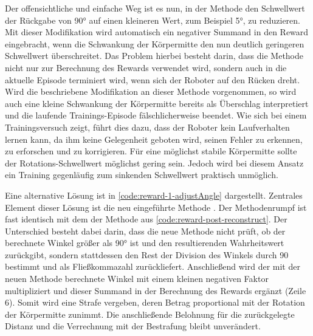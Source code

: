 Der offensichtliche und einfache Weg ist es nun, in der Methode  den Schwellwert der Rückgabe von 90° auf einen kleineren Wert, zum Beispiel 5°, zu reduzieren.
Mit dieser Modifikation wird automatisch ein negativer Summand in den Reward eingebracht, wenn die Schwankung der Körpermitte den nun deutlich geringeren Schwellwert überschreitet.
Das Problem hierbei besteht darin, dass die Methode  nicht nur zur Berechnung des Rewards verwendet wird, sondern auch in  die aktuelle Episode terminiert wird, wenn sich der Roboter auf den Rücken dreht.
Wird die beschriebene Modifikation an dieser Methode vorgenommen, so wird auch eine kleine Schwankung der Körpermitte bereits als Überschlag interpretiert und die laufende Trainings-Episode fälschlicherweise beendet.
Wie sich bei einem Trainingsversuch zeigt, führt dies dazu, dass der Roboter kein Laufverhalten lernen kann, da ihm keine Gelegenheit geboten wird, seinen Fehler zu erkennen, zu erforschen und zu korrigieren.
Für eine möglichst stabile Körpermitte sollte der Rotations-Schwellwert möglichst gering sein.
Jedoch wird bei diesem Ansatz ein Training gegenläufig zum sinkenden Schwellwert praktisch unmöglich.

\begin{figure}
    
\end{figure}

Eine alternative Lösung ist in \autoref{code:reward-1-adjustAngle} dargestellt.
Zentrales Element dieser Lösung ist die neu eingeführte Methode .
Der Methodenrumpf ist fast identisch mit dem der Methode  aus \autoref{code:reward-post-reconstruct}.
Der Unterschied besteht dabei darin, dass die neue Methode nicht prüft, ob der berechnete Winkel größer als 90° ist und den resultierenden Wahrheitswert zurückgibt, sondern stattdessen den Rest der Division des Winkels durch 90 bestimmt und als Fließkommazahl zurückliefert.
Anschließend wird der mit der neuen Methode berechnete Winkel mit einem kleinen negativen Faktor multipliziert und dieser Summand in der Berechnung des Rewards ergänzt (Zeile 6).
Somit wird eine Strafe vergeben, deren Betrag proportional mit der Rotation der Körpermitte zunimmt.
Die anschließende Belohnung für die zurückgelegte Distanz und die Verrechnung mit der Bestrafung bleibt unverändert.

